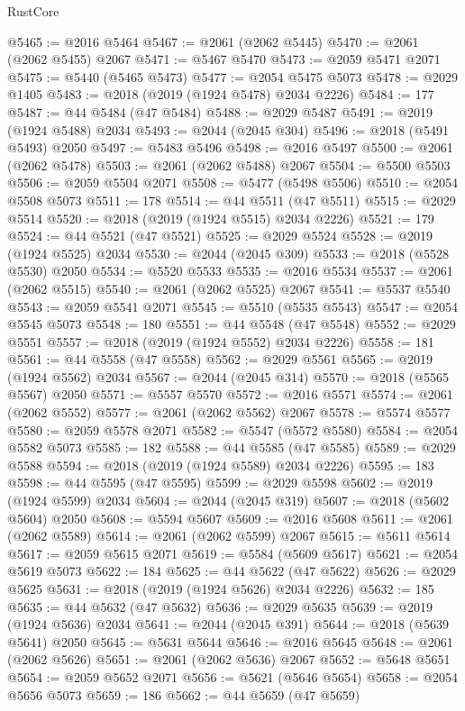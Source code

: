 \begin{lexlean}{RustCore}
\begin{coremodule}
@5465 := @2016 @5464
@5467 := @2061 (@2062 @5445)
@5470 := @2061 (@2062 @5455) @2067
@5471 := @5467 @5470
@5473 := @2059 @5471 @2071
@5475 := @5440 (@5465 @5473)
@5477 := @2054 @5475 @5073
@5478 := @2029 @1405
@5483 := @2018 (@2019 (@1924 @5478) @2034 @2226)
@5484 := 177
@5487 := @44 @5484 (@47 @5484)
@5488 := @2029 @5487
@5491 := @2019 (@1924 @5488) @2034
@5493 := @2044 (@2045 @304)
@5496 := @2018 (@5491 @5493) @2050
@5497 := @5483 @5496
@5498 := @2016 @5497
@5500 := @2061 (@2062 @5478)
@5503 := @2061 (@2062 @5488) @2067
@5504 := @5500 @5503
@5506 := @2059 @5504 @2071
@5508 := @5477 (@5498 @5506)
@5510 := @2054 @5508 @5073
@5511 := 178
@5514 := @44 @5511 (@47 @5511)
@5515 := @2029 @5514
@5520 := @2018 (@2019 (@1924 @5515) @2034 @2226)
@5521 := 179
@5524 := @44 @5521 (@47 @5521)
@5525 := @2029 @5524
@5528 := @2019 (@1924 @5525) @2034
@5530 := @2044 (@2045 @309)
@5533 := @2018 (@5528 @5530) @2050
@5534 := @5520 @5533
@5535 := @2016 @5534
@5537 := @2061 (@2062 @5515)
@5540 := @2061 (@2062 @5525) @2067
@5541 := @5537 @5540
@5543 := @2059 @5541 @2071
@5545 := @5510 (@5535 @5543)
@5547 := @2054 @5545 @5073
@5548 := 180
@5551 := @44 @5548 (@47 @5548)
@5552 := @2029 @5551
@5557 := @2018 (@2019 (@1924 @5552) @2034 @2226)
@5558 := 181
@5561 := @44 @5558 (@47 @5558)
@5562 := @2029 @5561
@5565 := @2019 (@1924 @5562) @2034
@5567 := @2044 (@2045 @314)
@5570 := @2018 (@5565 @5567) @2050
@5571 := @5557 @5570
@5572 := @2016 @5571
@5574 := @2061 (@2062 @5552)
@5577 := @2061 (@2062 @5562) @2067
@5578 := @5574 @5577
@5580 := @2059 @5578 @2071
@5582 := @5547 (@5572 @5580)
@5584 := @2054 @5582 @5073
@5585 := 182
@5588 := @44 @5585 (@47 @5585)
@5589 := @2029 @5588
@5594 := @2018 (@2019 (@1924 @5589) @2034 @2226)
@5595 := 183
@5598 := @44 @5595 (@47 @5595)
@5599 := @2029 @5598
@5602 := @2019 (@1924 @5599) @2034
@5604 := @2044 (@2045 @319)
@5607 := @2018 (@5602 @5604) @2050
@5608 := @5594 @5607
@5609 := @2016 @5608
@5611 := @2061 (@2062 @5589)
@5614 := @2061 (@2062 @5599) @2067
@5615 := @5611 @5614
@5617 := @2059 @5615 @2071
@5619 := @5584 (@5609 @5617)
@5621 := @2054 @5619 @5073
@5622 := 184
@5625 := @44 @5622 (@47 @5622)
@5626 := @2029 @5625
@5631 := @2018 (@2019 (@1924 @5626) @2034 @2226)
@5632 := 185
@5635 := @44 @5632 (@47 @5632)
@5636 := @2029 @5635
@5639 := @2019 (@1924 @5636) @2034
@5641 := @2044 (@2045 @391)
@5644 := @2018 (@5639 @5641) @2050
@5645 := @5631 @5644
@5646 := @2016 @5645
@5648 := @2061 (@2062 @5626)
@5651 := @2061 (@2062 @5636) @2067
@5652 := @5648 @5651
@5654 := @2059 @5652 @2071
@5656 := @5621 (@5646 @5654)
@5658 := @2054 @5656 @5073
@5659 := 186
@5662 := @44 @5659 (@47 @5659)

\end{coremodule}
\end{lexlean}

